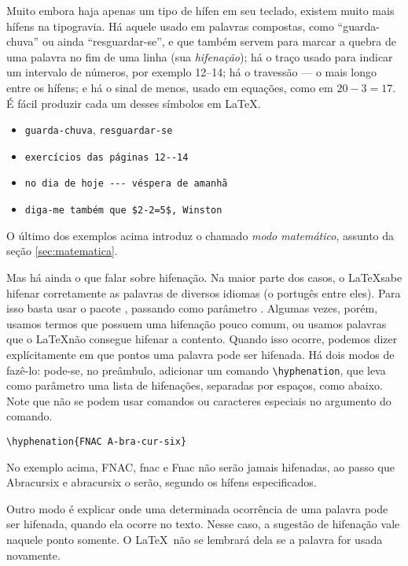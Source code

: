 Muito embora haja apenas um tipo de hífen em seu teclado, existem
muito mais hífens na tipogravia. Há aquele usado em palavras
compostas, como ``guarda-chuva'' ou ainda ``resguardar-se'', e que também
servem para marcar a quebra de uma palavra no fim de uma linha
(sua \emph{hifenação}); há o traço usado para indicar um intervalo de números,
por exemplo 12--14; há o travessão --- o mais longo entre os hífens; e
há o sinal de menos, usado em equações, como em $20-3=17$. É fácil
produzir cada um desses símbolos em \LaTeX.

\begin{itemize}\footnotesize
\item \verb'guarda-chuva', \verb'resguardar-se'
\item \verb'exercícios das páginas 12--14' 
\item \verb'no dia de hoje --- véspera de amanhã'
\item \verb'diga-me também que $2-2=5$, Winston'
\end{itemize}

O último dos exemplos acima introduz o chamado \emph{modo
  matemático}, assunto da seção
\ref{sec:matematica}.

Mas há ainda o que falar sobre hifenação. Na maior parte dos casos, o
\LaTeX sabe hifenar corretamente as palavras de diversos idiomas (o
portugês entre eles). Para isso basta usar o pacote ,
passando como parâmetro . Algumas vezes, porém,
usamos termos que possuem uma hifenação pouco comum, ou usamos
palavras que o \LaTeX não consegue hifenar a contento. Quando isso
ocorre, podemos dizer explícitamente em que pontos uma palavra pode
ser hifenada. Há dois modos de fazê-lo: pode-se, no preâmbulo,
adicionar um comando \verb'\hyphenation', que leva como parâmetro uma
lista de hifenações, separadas por espaços, como abaixo. Note que não
se podem usar comandos ou caracteres especiais no argumento do comando. 

\begin{center}
  \verb'\hyphenation{FNAC A-bra-cur-six}'
\end{center}

No exemplo acima, FNAC, fnac e Fnac não serão jamais hifenadas, ao
passo que Abracursix e abracursix o serão, segundo os hífens
especificados.

Outro modo é explicar onde uma determinada ocorrência de uma palavra
pode ser hifenada, quando ela ocorre no texto. Nesse caso, a sugestão
de hifenação vale naquele ponto somente. O \LaTeX\ não se lembrará
dela se a palavra for usada novamente.

